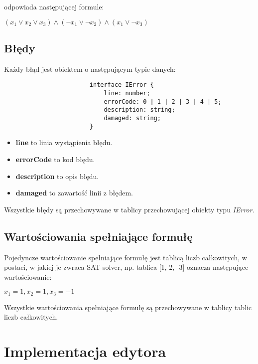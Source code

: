 \documentclass[a4paper,12pt]{book}
\theoremstyle{definition}
\begin{document}
\noindent odpowiada następującej formule:

\begin{center}
    $(x_1 \lor x_2 \lor x_3) \land (\neg x_1 \lor \neg x_2) \land (x_1 \lor \neg x_3)$
\end{center}

\subsection{Błędy}

Każdy błąd jest obiektem o następującym typie danych:

\begin{verbatim}
                        interface IError {
                            line: number;
                            errorCode: 0 | 1 | 2 | 3 | 4 | 5;
                            description: string;
                            damaged: string;
                        }
\end{verbatim}

\begin{itemize}
    \item \textbf{line} to linia wystąpienia błędu.
    \item \textbf{errorCode} to kod błędu.
    \item \textbf{description} to opis błędu.
    \item \textbf{damaged} to zawartość linii z błędem.
\end{itemize}

Wszystkie błędy są przechowywane w tablicy przechowującej obiekty typu \textit{IError}.

\subsection{Wartościowania spełniające formułę}

Pojedyncze wartościowanie spełniające formułę jest tablicą liczb całkowitych, w postaci, w jakiej je zwraca SAT-solver, np. tablica [1, 2, -3] oznacza następujące wartościowanie:

\begin{center}
    $x_1 = 1, x_2 = 1, x_3 = -1$
\end{center}

Wszystkie wartościowania spełniające formułę są przechowywane w tablicy tablic liczb całkowitych.

\section{Implementacja edytora}
\end{document}
